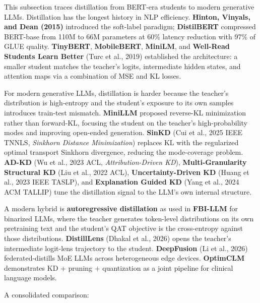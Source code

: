 \documentclass{article}
\begin{document}
This subsection traces distillation from BERT-era students to modern generative LLMs. Distillation has the longest history in NLP efficiency. \textbf{Hinton, Vinyals, and Dean (2015)} introduced the soft-label paradigm; \textbf{DistilBERT} \citep{sanh2019distilbertadistill} compressed BERT-base from 110M to 66M parameters at 60\% latency reduction with 97\% of GLUE quality. \textbf{TinyBERT}, \textbf{MobileBERT}, \textbf{MiniLM}, and \textbf{Well-Read Students Learn Better} (Turc et al., 2019) established the architecture: a smaller student matches the teacher's logits, intermediate hidden states, and attention maps via a combination of MSE and KL losses.

For modern generative LLMs, distillation is harder because the teacher's distribution is high-entropy and the student's exposure to its own samples introduces train-test mismatch. \textbf{MiniLLM} \citep{gu2024mambalineartimeseq} proposed reverse-KL minimization rather than forward-KL, focusing the student on the teacher's high-probability modes and improving open-ended generation. \textbf{SinKD} (Cui et al., 2025 IEEE TNNLS, \emph{Sinkhorn Distance Minimization}) replaces KL with the regularized optimal transport Sinkhorn divergence, reducing the mode-coverage problem. \textbf{AD-KD} (Wu et al., 2023 ACL, \emph{Attribution-Driven KD}), \textbf{Multi-Granularity Structural KD} (Liu et al., 2022 ACL), \textbf{Uncertainty-Driven KD} (Huang et al., 2023 IEEE TASLP), and \textbf{Explanation Guided KD} (Yang et al., 2024 ACM TALLIP) tune the distillation signal to the LLM's own internal structure.

A modern hybrid is \textbf{autoregressive distillation} as used in \textbf{FBI-LLM} \citep{ma20242024} for binarized LLMs, where the teacher generates token-level distributions on its own pretraining text and the student's QAT objective is the cross-entropy against those distributions. \textbf{DistillLens} (Dhakal et al., 2026) opens the teacher's intermediate logit-lens trajectory to the student. \textbf{DeepFusion} (Li et al., 2026) federated-distills MoE LLMs across heterogeneous edge devices. \textbf{OptimCLM} \citep{hasan2025optimclmoptimizing} demonstrates KD + pruning + quantization as a joint pipeline for clinical language models.

A consolidated comparison:
\end{document}
